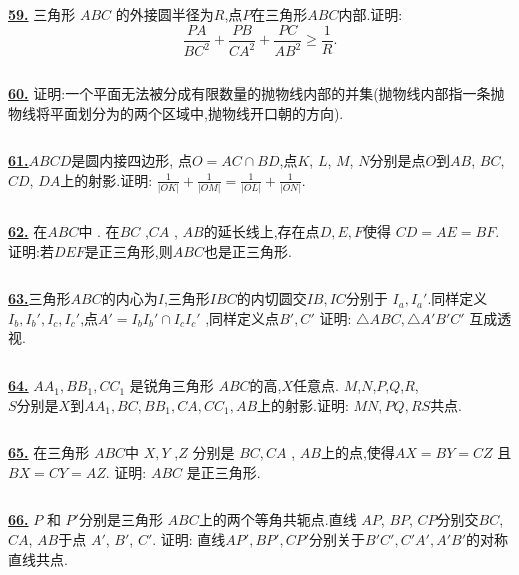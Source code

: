\documentclass{article}
\begin{document}
$$ $$

\href{ http://www.artofproblemsolving.com/Forum/viewtopic.php?p=20670#p20670
}{\bf 59.} 三角形 $ ABC$ 的外接圆半径为$ R$,点$ P$在三角形$ABC$内部.证明:
$$ \frac {PA}{BC^{2}} + \frac {PB}{CA^{2}} + \frac {PC}{AB^{2}}\ge \frac {1}{R}.
$$


$$ $$

\href{http://www.artofproblemsolving.com/Forum/viewtopic.php?p=794452#p794452
 }{\bf 60.} 证明:一个平面无法被分成有限数量的抛物线内部的并集(抛物线内部指一条抛物线将平面划分为的两个区域中,抛物线开口朝的方向).

$$ $$


\href{ http://www.artofproblemsolving.com/Forum/viewtopic.php?p=960160#p960160
}{\bf 61.}$ABCD$是圆内接四边形, 点$O = AC \cap BD$,点$ K$, $ L$, $ M$, $ N$分别是点$ O$到$ AB$, $ BC$, $ CD$, $ DA$上的射影.证明: $ \displaystyle\frac {1}{\left|OK\right|} + \frac {1}{\left|OM\right|} = \frac{1}{\left|OL\right|} + \frac {1}{\left|ON\right|}$.


$$ $$

\href{ http://www.artofproblemsolving.com/Forum/viewtopic.php?p=515828&#p515828
}{\bf 62.} 在$ABC$中 . 在$BC$  ,$CA$ , $AB$的延长线上,存在点$D,E,F$使得 $CD=AE=BF$.
证明:若$DEF$是正三角形,则$ABC$也是正三角形.


$$ $$

\href{http://www.artofproblemsolving.com/Forum/viewtopic.php?p=744569#p744569
 }{\bf 63.}三角形$ABC$的内心为$I$,三角形$IBC$的内切圆交$IB,IC$分别于 $I_{a},I_{a}'$.同样定义$I_{b},I_{b}',I_{c},I_{c}'$,点$A'=I_{b}I_{b}'\cap I_{c}I_{c}'$ ,同样定义点$B',C'$ 证明: $\triangle ABC,\triangle A'B'C'$ 互成透视.

$$ $$


\href{ http://www.artofproblemsolving.com/Forum/viewtopic.php?p=715139#p715139
}{\bf 64.}  $ AA_{1},BB_{1},CC_{1}$ 是锐角三角形 $ ABC$的高,$ X$任意点. $ M$,$N$,$P$,$Q$,$R$,\\$S$分别是$ X$到$ AA_{1},BC,BB_{1},CA,CC_{1},AB$上的射影.证明: $ MN,PQ,RS$共点.


$$ $$

\href{http://www.artofproblemsolving.com/Forum/viewtopic.php?p=558585#p558585
 }{\bf 65.} 在三角形 $ABC$中 $X,Y$ ,$Z$ 分别是 $BC,CA$ , $AB$上的点,使得$AX=BY=CZ$ 且$BX=CY=AZ.$ 证明: $ABC$ 是正三角形.


$$ $$

\href{ http://www.artofproblemsolving.com/Forum/viewtopic.php?p=124095#p124095
}{\bf 66.}  $P$ 和 $P'$分别是三角形 $ABC$上的两个等角共轭点.直线 $AP$, $BP$, $CP$分别交$BC$, $CA$, $AB$于点 $A'$, $B'$, $C'$.
证明: 直线$AP', BP', CP'$分别关于$B'C', C'A', A'B'$的对称直线共点.
\end{document}
